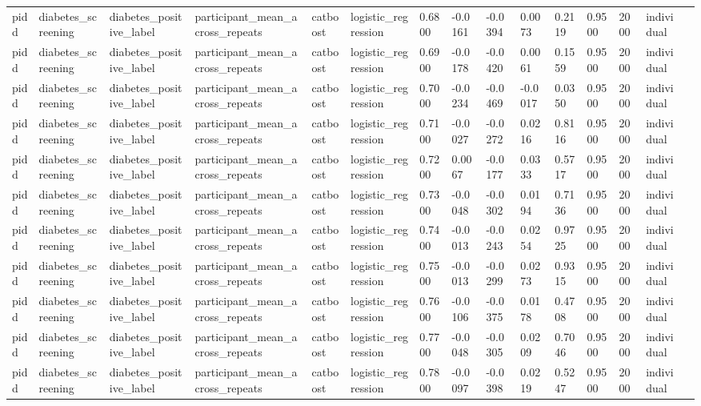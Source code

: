 \begin{tabular}{lllllllllllllll}
pidd & diabetes\_screening & diabetes\_positive\_label & participant\_mean\_across\_repeats & catboost & logistic\_regression & 0.6800 & -0.0161 & -0.0394 & 0.0073 & 0.2119 & 0.9500 & 2000 & individual &  \\
pidd & diabetes\_screening & diabetes\_positive\_label & participant\_mean\_across\_repeats & catboost & logistic\_regression & 0.6900 & -0.0178 & -0.0420 & 0.0061 & 0.1559 & 0.9500 & 2000 & individual &  \\
pidd & diabetes\_screening & diabetes\_positive\_label & participant\_mean\_across\_repeats & catboost & logistic\_regression & 0.7000 & -0.0234 & -0.0469 & -0.0017 & 0.0350 & 0.9500 & 2000 & individual &  \\
pidd & diabetes\_screening & diabetes\_positive\_label & participant\_mean\_across\_repeats & catboost & logistic\_regression & 0.7100 & -0.0027 & -0.0272 & 0.0216 & 0.8116 & 0.9500 & 2000 & individual &  \\
pidd & diabetes\_screening & diabetes\_positive\_label & participant\_mean\_across\_repeats & catboost & logistic\_regression & 0.7200 & 0.0067 & -0.0177 & 0.0333 & 0.5717 & 0.9500 & 2000 & individual &  \\
pidd & diabetes\_screening & diabetes\_positive\_label & participant\_mean\_across\_repeats & catboost & logistic\_regression & 0.7300 & -0.0048 & -0.0302 & 0.0194 & 0.7136 & 0.9500 & 2000 & individual &  \\
pidd & diabetes\_screening & diabetes\_positive\_label & participant\_mean\_across\_repeats & catboost & logistic\_regression & 0.7400 & -0.0013 & -0.0243 & 0.0254 & 0.9725 & 0.9500 & 2000 & individual &  \\
pidd & diabetes\_screening & diabetes\_positive\_label & participant\_mean\_across\_repeats & catboost & logistic\_regression & 0.7500 & -0.0013 & -0.0299 & 0.0273 & 0.9315 & 0.9500 & 2000 & individual &  \\
pidd & diabetes\_screening & diabetes\_positive\_label & participant\_mean\_across\_repeats & catboost & logistic\_regression & 0.7600 & -0.0106 & -0.0375 & 0.0178 & 0.4708 & 0.9500 & 2000 & individual &  \\
pidd & diabetes\_screening & diabetes\_positive\_label & participant\_mean\_across\_repeats & catboost & logistic\_regression & 0.7700 & -0.0048 & -0.0305 & 0.0209 & 0.7046 & 0.9500 & 2000 & individual &  \\
pidd & diabetes\_screening & diabetes\_positive\_label & participant\_mean\_across\_repeats & catboost & logistic\_regression & 0.7800 & -0.0097 & -0.0398 & 0.0219 & 0.5247 & 0.9500 & 2000 & individual &  \\

\end{tabular}
